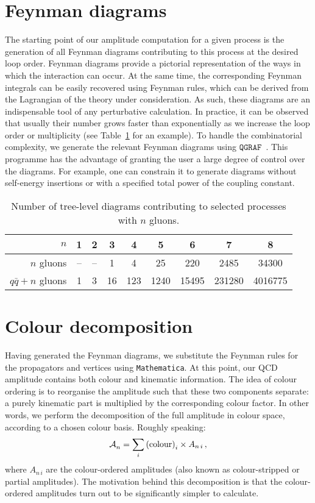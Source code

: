 \documentclass[main.tex]{subfiles}
\begin{document}
\section{Feynman diagrams}
The starting point of our amplitude computation for a given process is the generation of all Feynman diagrams contributing to this process at the desired loop order. Feynman diagrams provide a pictorial representation of the ways in which the interaction can occur.
At the same time, the corresponding Feynman integrals can be easily recovered using Feynman rules, which can be derived from the Lagrangian of the theory under consideration. As such, these diagrams are an indispensable tool of any perturbative calculation. In practice, it can be observed that usually their number grows faster than exponentially as we increase the loop order or multiplicity (see Table~\ref{tab:ndiags} for an example). To handle the combinatorial complexity, we generate the relevant Feynman diagrams using $\texttt{QGRAF}$~\cite{Nogueira:1991ex}. This programme has the advantage of granting the user a large degree of control over the diagrams. For example, one can constrain it to generate diagrams without self-energy insertions or with a specified total power of the coupling constant.
\begin{table}[b]
	\begin{center}
		\begin{tabular}{r|c|c|c|c|c|c|c|c}
			  $n$ & 1 & 2 & 3 & 4 & 5 & 6 & 7 & 8 \\
			\hline
			$n$ gluons   & -- & -- & 1 & 4 & 25 & 220 & 2485 & 34300 \\
			$q\bar{q} + n$ gluons & 1 & 3 & 16 & 123 & 1240 & 15495 & 231280 & 4016775 \\
		\end{tabular}
	\end{center}
 \caption{Number of tree-level diagrams contributing to selected processes with $n$ gluons.}
 \label{tab:ndiags}
\end{table}
\section{Colour decomposition} \label{sec:colourdec}
Having generated the Feynman diagrams, we substitute the Feynman rules for the propagators and vertices using \texttt{Mathematica}. At this point, our QCD amplitude contains both colour and kinematic information. The idea of colour ordering is to reorganise the amplitude such that these two components separate: a purely kinematic part is multiplied by the corresponding colour factor. In other words, we perform the decomposition of the full amplitude in colour space, according to a chosen colour basis. Roughly speaking:
\begin{equation}
    \mathcal{A}_{n}^{} = \sum_i \text{(colour)}_i \times A_{n\,i} \,, 
\end{equation}
where $A_{n\,i}$ are the colour-ordered amplitudes (also known as colour-stripped or partial amplitudes). The motivation behind this decomposition is that the colour-ordered amplitudes turn out to be significantly simpler to calculate.
\end{document}
